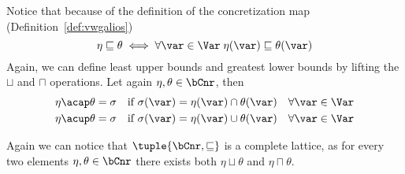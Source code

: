 Notice that because of the definition of the concretization map
(Definition~\ref{def:vwgalios})
\begin{equation*}
  \eta \sqsubseteq \theta \iff \forall \var \in \Var \; \eta(\var) \sqsubseteq \theta(\var)
\end{equation*}
Again, we can define least upper bounds and greatest lower bounds by
lifting the \(\sqcup\) and \(\sqcap\) operations. Let again
\(\eta, \theta \in \bCnr\), then
\begin{align*}
  \eta \acap \theta = \sigma & \quad \text{if } \sigma(\var) = \eta(\var) \cap \theta(\var) \quad \forall \var\in\Var \\
  \eta \acup \theta = \sigma & \quad \text{if } \sigma(\var) = \eta(\var) \cup \theta(\var) \quad \forall \var\in\Var \\
\end{align*}

Again we can notice that \(\tuple{\bCnr, \sqsubseteq}\) is a complete
lattice, as for every two elements \(\eta,\theta\in\bCnr\) there
exists both \(\eta \sqcup \theta\) and \(\eta \sqcap \theta\).
